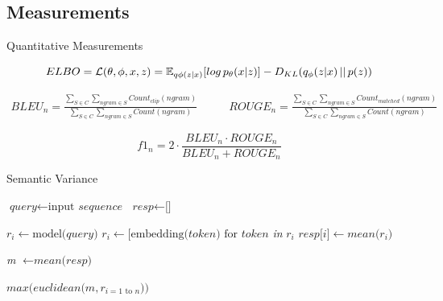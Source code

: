 \documentclass[aspectratio=169, 11pt]{beamer}
\begin{document}
\subsection{Measurements}
\begin{frame}{Quantitative Measurements}
\small

  \begin{equation*}
    \label{eqn:elbo}
    ELBO = \mathcal{L}(\theta, \phi, x, z) = \mathbb{E}_{q \phi (z|x)}[log \thinspace p_{\theta}(x|z)] - D_{KL}(q_{\phi}(z|x)\thinspace||\thinspace p(z))
  \end{equation*}
  
    \begin{equation*}
      \begin{split}
        BLEU_n = \frac
        {\sum_{S\in C} \sum_{ngram\in S} Count_{clip}(ngram)}
        {\sum_{S\in C} \sum_{ngram\in S} Count(ngram)}
      \end{split}
      \quad\quad
      \begin{split}
        ROUGE_n = \frac
        {\sum_{S\in C} \sum_{ngram\in S} Count_{matched}(ngram)}
        {\sum_{S\in C} \sum_{ngram\in S} Count(ngram)}
      \end{split}
    \end{equation*}


    \begin{equation*}
      f1_{n} = 2 \cdot \frac{BLEU_n \cdot ROUGE_n}{BLEU_n + ROUGE_n}
    \end{equation*}

\end{frame}

\begin{frame}{Semantic Variance}

    \begin{algorithmic}[1]
  
    \State $\textit{query} \gets \text{input }\textit{sequence}$
    \State $\textit{resp} \gets \text{[]}$
    
  
      \State $r_i \gets \text{model(}\textit{query}\text{)}$
      \State $r_i \gets \text{[}\text{embedding}\text{(} token \text{) for } token $\emph{ in }$r_i$\text{]}
      \State $\textit{resp}\text{[}\textit{i}\text{]} \gets \textit{mean}\text{(}r_i\text{)}$
    \EndFor 
  
    \State \emph{m} $\gets \textit{mean} \text{(} \textit{resp} \text{)}$
  
    \State \Return $\textit{max}\text{(}\textit{euclidean}\text{(}m, r_{i=1 \text{ to } n}\text{))}$
    \EndProcedure
    \end{algorithmic}

\end{frame}
\end{document}

